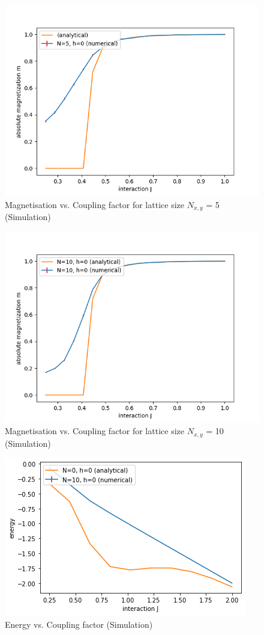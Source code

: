 \documentclass{article}
\begin{document}
\begin{figure}[h!]
    \centering
    \includegraphics[width=.8\textwidth]{N5_numJ20.png}
    \caption{Magnetisation vs. Coupling factor for lattice size $N_{x,y}$ = 5 (Simulation)}
    \label{fig:mag-int_N5}
\end{figure}
\begin{figure}[h!]
    \centering
    \includegraphics[width=.8\textwidth]{N10_numJ20.png}
    \caption{Magnetisation vs. Coupling factor for lattice size $N_{x,y}$ = 10  (Simulation)}
    \label{fig:mag-int_N10}
\end{figure}
\begin{figure}[h!]
    \centering
    \includegraphics[width=.8\textwidth]{energy-int.png}
    \caption{Energy vs. Coupling factor (Simulation)}
    \label{fig:enrgy-int}
\end{figure}
\end{document}
